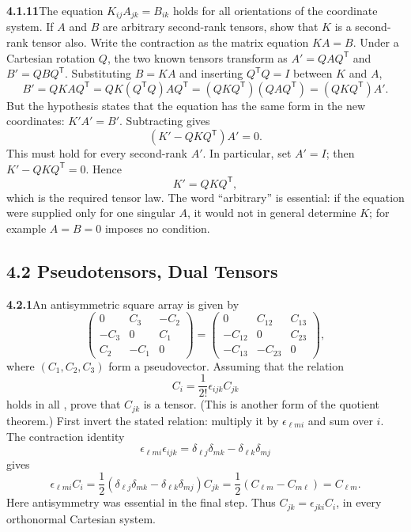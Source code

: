 \par\bigskip
\noindent\textbf{4.1.11}\quad The equation $K_{ij}A_{jk}=B_{ik}$ holds for all
orientations of the coordinate system. If $A$ and $B$ are arbitrary
second-rank tensors, show that $K$ is a second-rank tensor also.
\solution
Write the contraction as the matrix equation $KA=B$. Under a
Cartesian rotation $Q$, the two known tensors transform as
$A'=QAQ^{\mathsf T}$ and $B'=QBQ^{\mathsf T}$. Substituting $B=KA$ and
inserting $Q^{\mathsf T}Q=I$ between $K$ and $A$,
\[
B'=QKAQ^{\mathsf T}
  =QK(Q^{\mathsf T}Q)AQ^{\mathsf T}
  =(QKQ^{\mathsf T})(QAQ^{\mathsf T})
  =(QKQ^{\mathsf T})A'.
\]
But the hypothesis states that the equation has the same form in the
new coordinates: $K'A'=B'$. Subtracting gives
\[
(K'-QKQ^{\mathsf T})A'=0.
\]
This must hold for every second-rank $A'$. In particular, set $A'=I$;
then $K'-QKQ^{\mathsf T}=0$. Hence
\[
\boxed{K'=QKQ^{\mathsf T}},
\]
which is the required tensor law. The word ``arbitrary'' is essential:
if the equation were supplied only for one singular $A$, it would not
in general determine $K$; for example $A=B=0$ imposes no condition.

\subsection*{4.2 Pseudotensors, Dual Tensors}

\par\bigskip
\noindent\textbf{4.2.1}\quad An antisymmetric square array is given by
\[
\begin{pmatrix}0&C_{3}&-C_{2}\\-C_{3}&0&C_{1}\\C_{2}&-C_{1}&0\end{pmatrix}
=\begin{pmatrix}0&C_{12}&C_{13}\\-C_{12}&0&C_{23}\\
-C_{13}&-C_{23}&0\end{pmatrix},
\]
where $(C_{1},C_{2},C_{3})$ form a pseudovector. Assuming that the relation
\[
C_{i}=\frac{1}{2!}\epsilon_{ijk}C_{jk}
\]
holds in all , prove that $C_{jk}$ is a tensor. (This is
another form of the quotient theorem.)
\solution
{}
First invert the stated relation: multiply it by $\epsilon_{\ell mi}$
and sum over $i$. The contraction identity
\[
\epsilon_{\ell mi}\epsilon_{ijk}
=\delta_{\ell j}\delta_{mk}-\delta_{\ell k}\delta_{mj}
\]
gives
\[
\epsilon_{\ell mi}C_i
=\frac12(\delta_{\ell j}\delta_{mk}-\delta_{\ell k}\delta_{mj})C_{jk}
=\frac12(C_{\ell m}-C_{m\ell})=C_{\ell m}.
\]
Here antisymmetry was essential in the final step. Thus
$C_{jk}=\epsilon_{jki}C_i$, in every orthonormal Cartesian system.

